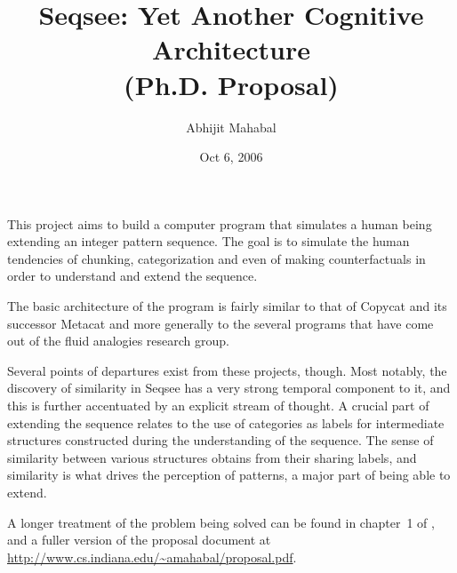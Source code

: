 \documentclass[12pt]{article}
\begin{document}
\title{Seqsee: Yet Another Cognitive Architecture\\{(Ph.D. Proposal)}}
\author{Abhijit Mahabal}
\date{Oct 6, 2006}
\maketitle

\newcommand{\sequence}[1]{`\emph{#1 }{\ensuremath\ldots}'\xspace}

This project aims to build a computer program that simulates a human being extending an integer
 pattern sequence. The goal is to simulate the human tendencies of chunking, categorization and even of making counterfactuals in order to understand and extend the sequence.

The basic architecture of the program is fairly similar to that of Copycat \cite{Mitchell90} and its successor Metacat \cite{Marshall} and more generally to the several programs that have come out of the fluid analogies research group. 

Several points of departures exist from these projects, though. Most notably, the discovery of similarity in Seqsee has a very strong temporal component to it, and this is further accentuated by an explicit stream of thought. A crucial part of extending the sequence relates to the use of categories as labels for intermediate structures constructed during the understanding of the sequence. The sense of similarity between various structures obtains from their sharing labels, and similarity is what drives the perception of patterns, a major part of being able to extend.

A longer treatment of the problem being solved can be found in chapter~1 of , and a fuller version of the proposal document at \url{http://www.cs.indiana.edu/~amahabal/proposal.pdf}.



\end{document}

